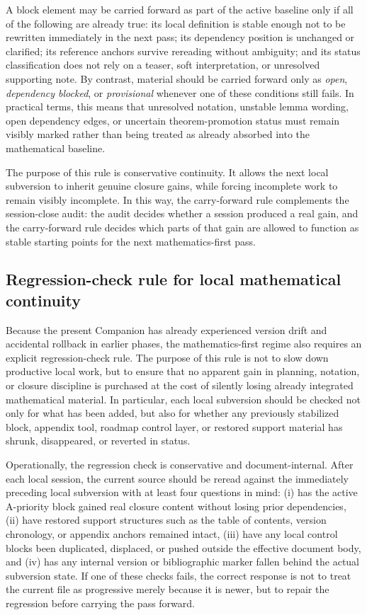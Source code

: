 \documentclass[12pt,a4paper]{article}
\begin{document}
A block element may be carried forward as part of the active baseline only if all of the following are already true: its local definition is stable enough not to be rewritten immediately in the next pass; its dependency position is unchanged or clarified; its reference anchors survive rereading without ambiguity; and its status classification does not rely on a teaser, soft interpretation, or unresolved supporting note. By contrast, material should be carried forward only as \emph{open}, \emph{dependency blocked}, or \emph{provisional} whenever one of these conditions still fails. In practical terms, this means that unresolved notation, unstable lemma wording, open dependency edges, or uncertain theorem-promotion status must remain visibly marked rather than being treated as already absorbed into the mathematical baseline.

The purpose of this rule is conservative continuity. It allows the next local subversion to inherit genuine closure gains, while forcing incomplete work to remain visibly incomplete. In this way, the carry-forward rule complements the session-close audit: the audit decides whether a session produced a real gain, and the carry-forward rule decides which parts of that gain are allowed to function as stable starting points for the next mathematics-first pass.


\subsection*{Regression-check rule for local mathematical continuity}
Because the present Companion has already experienced version drift and accidental rollback in earlier phases, the mathematics-first regime also requires an explicit regression-check rule. The purpose of this rule is not to slow down productive local work, but to ensure that no apparent gain in planning, notation, or closure discipline is purchased at the cost of silently losing already integrated mathematical material. In particular, each local subversion should be checked not only for what has been added, but also for whether any previously stabilized block, appendix tool, roadmap control layer, or restored support material has shrunk, disappeared, or reverted in status.

Operationally, the regression check is conservative and document-internal. After each local session, the current source should be reread against the immediately preceding local subversion with at least four questions in mind: (i) has the active A-priority block gained real closure content without losing prior dependencies, (ii) have restored support structures such as the table of contents, version chronology, or appendix anchors remained intact, (iii) have any local control blocks been duplicated, displaced, or pushed outside the effective document body, and (iv) has any internal version or bibliographic marker fallen behind the actual subversion state. If one of these checks fails, the correct response is not to treat the current file as progressive merely because it is newer, but to repair the regression before carrying the pass forward.
\end{document}
